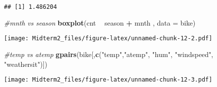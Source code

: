 \documentclass[]{article}
\newenvironment{Shaded}{\begin{snugshade}}{\end{snugshade}}
\newcommand{\KeywordTok}[1]{\textcolor[rgb]{0.13,0.29,0.53}{\textbf{#1}}}
\newcommand{\DataTypeTok}[1]{\textcolor[rgb]{0.13,0.29,0.53}{#1}}
\newcommand{\StringTok}[1]{\textcolor[rgb]{0.31,0.60,0.02}{#1}}
\newcommand{\CommentTok}[1]{\textcolor[rgb]{0.56,0.35,0.01}{\textit{#1}}}
\newcommand{\OperatorTok}[1]{\textcolor[rgb]{0.81,0.36,0.00}{\textbf{#1}}}
\newcommand{\NormalTok}[1]{#1}
\begin{document}
\begin{verbatim}
## [1] 1.486204
\end{verbatim}

\begin{Shaded}
\begin{Highlighting}[]
\CommentTok{#mnth vs season}
\KeywordTok{boxplot}\NormalTok{(cnt }\OperatorTok{~}\StringTok{  }\NormalTok{season }\OperatorTok{+}\StringTok{ }\NormalTok{mnth , }\DataTypeTok{data =}\NormalTok{ bike)}
\end{Highlighting}
\end{Shaded}

\texttt{[image: Midterm2\_files/figure-latex/unnamed-chunk-12-2.pdf]}

\begin{Shaded}
\begin{Highlighting}[]
\CommentTok{#temp vs atemp}
\KeywordTok{gpairs}\NormalTok{(bike[,}\KeywordTok{c}\NormalTok{(}\StringTok{"temp"}\NormalTok{,}\StringTok{"atemp"}\NormalTok{, }\StringTok{"hum"}\NormalTok{, }\StringTok{"windspeed"}\NormalTok{, }\StringTok{"weathersit"}\NormalTok{)])}
\end{Highlighting}
\end{Shaded}

\texttt{[image: Midterm2\_files/figure-latex/unnamed-chunk-12-3.pdf]}
\end{document}
